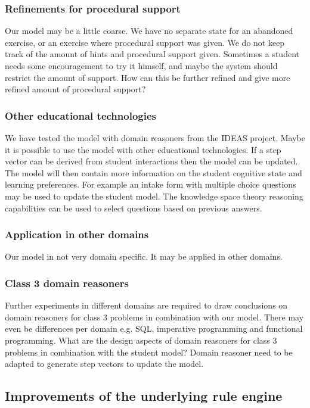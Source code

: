 \subsubsection{Refinements for procedural support}
\label{sec:refinem}
Our model may be a little coarse.
We have no separate state for an abandoned exercise, or an exercise where procedural support  was given.
We do not keep track of the amount of hints and procedural support given.
Sometimes a student needs some encouragement to try it himself, and maybe the system should restrict the amount of support.
How can this be further refined and give more refined amount of procedural support?

\subsubsection{Other educational technologies}
We have tested the model with domain reasoners from the IDEAS project.
Maybe it is possible to use the model with other educational technologies.
If  a step vector can be derived from student interactions then the model can be updated.
The model will then contain more information on the student cognitive state and learning preferences.
For example an intake form with multiple choice questions may be used to update the student model.
The knowledge space theory reasoning capabilities can be used to select questions based on previous answers.

\subsubsection{Application in other domains}
Our model in not very domain specific. It may be applied in other domains.

\subsubsection{Class 3 domain reasoners}
Further experiments in different domains are required to draw conclusions on domain reasoners for class 3 problems in combination with our model.
There may even be differences per domain e.g. SQL, imperative programming and functional programming.
What are the design aspects of domain reasoners for class 3 problems in combination with the student model?
Domain reasoner need to be adapted to generate step vectors to update the model.


\subsection{Improvements of the underlying rule engine}

